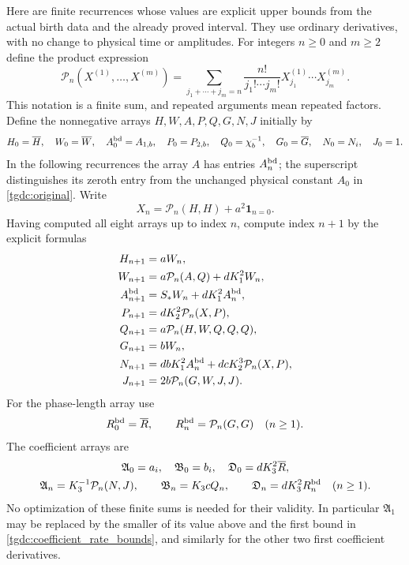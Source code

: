 \documentclass[11pt]{article}
\begin{document}
Here are finite recurrences whose values are explicit upper bounds
from the actual birth data and the already proved interval. They use
ordinary derivatives, with no change to physical time or amplitudes.
For integers $n\geq0$ and $m\geq2$ define the product expression
\[
 \mathcal P_n(X^{(1)},\ldots,X^{(m)})
 =\sum_{j_1+\cdots+j_m=n}
       \frac{n!}{j_1!\cdots j_m!}
       X^{(1)}_{j_1}\cdots X^{(m)}_{j_m}.
\]
This notation is a finite sum, and repeated arguments mean repeated
factors. Define the nonnegative arrays $H,W,A,P,Q,G,N,J$ initially by
\begin{equation}\label{tgdc:majorant_initial}
\begin{gathered}
 H_0=\overline H,\quad W_0=\overline W,\quad
 A_0^{\rm bd}=A_{1,b},\quad P_0=P_{2,b},\quad
 Q_0=\chi_b^{-1},\quad G_0=\overline G,\quad
 N_0=N_i,\quad J_0=1.
\end{gathered}
\end{equation}
In the following recurrences the array $A$ has entries $A_n^{\rm bd}$;
the superscript distinguishes its zeroth entry from the unchanged
physical constant $A_0$ in \eqref{tgdc:original}. Write
\[
 X_n=\mathcal P_n(H,H)+a^2\mathbf1_{n=0}.
\]
Having computed all eight arrays up to index $n$, compute index $n+1$
by the explicit formulas
\begin{equation}\label{tgdc:parent_majorants}
\begin{aligned}
 H_{n+1}&=aW_n,\\
 W_{n+1}&=a\mathcal P_n(A,Q)+dK_1^2W_n,\\
 A_{n+1}^{\rm bd}&=S_*W_n+dK_1^2A_n^{\rm bd},\\
 P_{n+1}&=dK_2^2\mathcal P_n(X,P),\\
 Q_{n+1}&=a\mathcal P_n(H,W,Q,Q,Q),\\
 G_{n+1}&=bW_n,\\
 N_{n+1}&=dbK_1^2A_n^{\rm bd}
                 +dcK_2^3\mathcal P_n(X,P),\\
 J_{n+1}&=2b\mathcal P_n(G,W,J,J).
\end{aligned}
\end{equation}
For the phase-length array use
\[
 R_0^{\rm bd}=\overline R,\qquad
 R_n^{\rm bd}=\mathcal P_n(G,G)\quad(n\geq1).
\]
The coefficient arrays are
\begin{equation}\label{tgdc:coefficient_majorants}
\begin{gathered}
 \mathfrak A_0=a_i,\quad \mathfrak B_0=b_i,\quad
 \mathfrak D_0=dK_3^2\overline R,\\
 \mathfrak A_n=K_3^{-1}\mathcal P_n(N,J),\qquad
 \mathfrak B_n=K_3cQ_n,\qquad
 \mathfrak D_n=dK_3^2R_n^{\rm bd}\quad(n\geq1).
\end{gathered}
\end{equation}
No optimization of these finite sums is needed for their validity.
In particular $\mathfrak A_1$ may be replaced by the smaller of its
value above and the first bound in \eqref{tgdc:coefficient_rate_bounds},
and similarly for the other two first coefficient derivatives.
\end{document}
